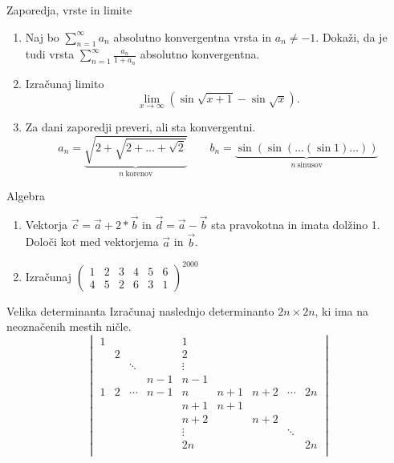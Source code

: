 \begin{frame}{Zaporedja, vrste in limite}
	\begin{enumerate}
		\item 
		Naj bo $\sum_{n=1}^\infty a_n$ absolutno konvergentna vrsta in $a_n \ne -1$.
		Dokaži, da je tudi vrsta $\sum_{n=1}^\infty \frac{a_n}{1+a_n}$
		absolutno konvergentna.

		\item
		Izračunaj limito
		$$\lim_{x\to\infty}(\sin\sqrt{x+1}-\sin\sqrt{x}).$$

		\item
		Za dani zaporedji preveri, ali sta konvergentni.
		$$ 
		a_n = \underbrace{\sqrt{2+\sqrt{2+\dots+\sqrt{2}}}}_{n~\text{korenov}} \qquad
		 b_n = \underbrace{\sin(\sin(\dots(\sin 1)\dots))}_{n~\text{sinusov}}
		$$
	\end{enumerate}
\end{frame}

\begin{frame}{Algebra}
	\begin{enumerate}
		\item
		Vektorja $\vec{c}=\vec{a}+2*\vec{b}$ in $\vec{d}=\vec{a}-\vec{b}$
		sta pravokotna in imata dolžino 1. Določi kot med vektorjema $\vec{a}$ in $\vec{b}$.
		\item 
		Izračunaj
		$ 
		\begin{pmatrix} 
			1 & 2 & 3 & 4 & 5 & 6 \\ 
			4 & 5 & 2 & 6 & 3 & 1
		\end{pmatrix}^{2000} 
		$
	\end{enumerate}
\end{frame}

\begin{frame}{Velika determinanta}
	Izračunaj naslednjo determinanto $2n \times 2n$, ki ima na neoznačenih mestih ničle.
	$$
	\begin{vmatrix}
		1 &&&& 1 \\
		& 2 &&& 2 \\
		&& \ddots && \vdots \\
		&&& n-1 & n-1 \\
		1 & 2 & \cdots & n-1 & n & n+1 & n+2 & \cdots & 2n \\
		&&&& n+1 & n+1 \\
		&&&& n+2 && n+2 \\
		&&&& \vdots &&& \ddots \\
		&&&& 2n &&&& 2n \\
	\end{vmatrix}
	$$
\end{frame}

